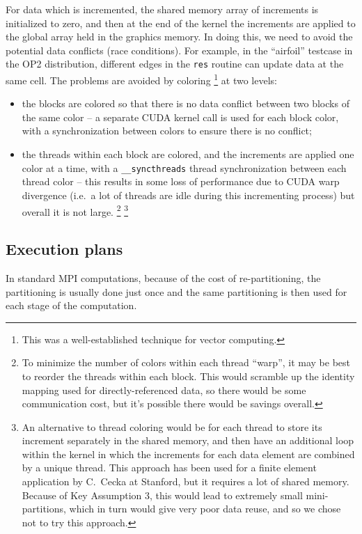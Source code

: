\documentclass[12pt]{article}
\begin{document}
For data which is incremented, the shared memory array of increments is
initialized to zero, and then at the end of the kernel the increments are
applied to the global array held in the graphics memory.  In doing this,
we need to avoid the potential data conflicts (race conditions).
For example, in the ``airfoil'' testcase in the OP2 distribution,
different edges in the {\tt res} routine can update data at the same
cell.  The problems are avoided by coloring
\footnote{This was a well-established technique for vector computing.}
at two levels:
\begin{itemize}
\item
the blocks are colored so that there is no data conflict between two
blocks of the same color -- a separate CUDA kernel call is used for each
block color, with a synchronization between colors to ensure there is no
conflict;
\item
the threads within each block are colored, and the increments are applied
one color at a time, with a {\tt \_\_syncthreads} thread synchronization
between each thread color -- this results in some loss of performance due
to CUDA warp divergence (i.e.~a lot of threads are idle during this
incrementing process) but overall it is not large.
\footnote{To minimize the number of colors within each thread ``warp'',
it may be best to reorder the threads within each block.  This would
scramble up the identity mapping used for directly-referenced data,
so there would be some communication cost, but it's possible there would
be savings overall.}
\footnote{
An alternative to thread coloring would be for each thread to store its
increment separately in the shared memory, and then have an additional loop
within the kernel in which the increments for each data element are combined
by a unique thread.  This approach has been used for a finite element
application by C.~Cecka at Stanford, but it requires a lot of shared memory.
Because of Key Assumption 3, this would lead to extremely small
mini-partitions, which in turn would give very poor data reuse, and so
we chose not to try this approach.}

\end{itemize}


\subsection{Execution plans}

In standard MPI computations, because of the cost of re-partitioning,
the partitioning is usually done just once and the same partitioning is
then used for each stage of the computation.
\end{document}
